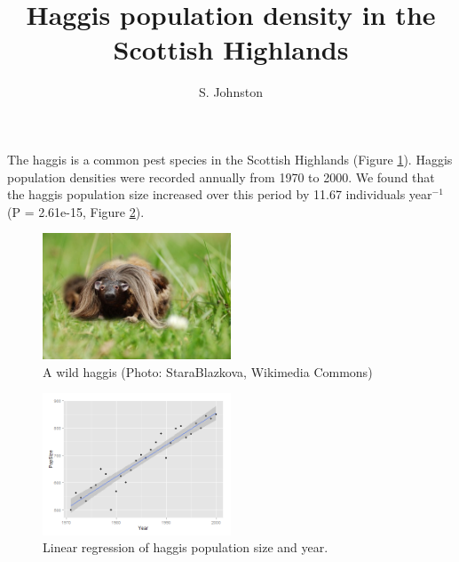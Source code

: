 \documentclass[12pt,a4paper]{article}
\title{Haggis population density in the Scottish Highlands}
\author{S. Johnston}
\affil{University of Edinburgh}
\begin{document}
\maketitle


The haggis is a common pest species in the Scottish Highlands (Figure \ref{fig:Haggis}). Haggis population densities were recorded annually from 1970 to 2000. We found that the haggis population size increased over this period by 11.67 individuals year$^{-1}$ (P = 2.61e-15, Figure \ref{fig:regressionplot}).

\begin{figure}[h] %
  \centering
    \includegraphics[width=0.5\textwidth]{images/WildHaggis}
    \caption{A wild haggis (Photo: StaraBlazkova, Wikimedia Commons)}
    \label{fig:Haggis}
\end{figure} 

\begin{figure}[h] %
  \centering
    \includegraphics[width=0.5\textwidth]{images/regressionplot}
    \caption{ Linear regression of haggis population size and year. }
    \label{fig:regressionplot}
\end{figure} 
\end{document}
